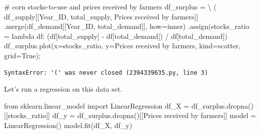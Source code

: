 \documentclass[
  letterpaper,
  DIV=11,
  numbers=noendperiod]{scrreprt}
\newenvironment{Shaded}{\begin{snugshade}}{\end{snugshade}}
\newcommand{\CommentTok}[1]{\textcolor[rgb]{0.37,0.37,0.37}{#1}}
\newcommand{\ImportTok}[1]{\textcolor[rgb]{0.00,0.46,0.62}{#1}}
\newcommand{\KeywordTok}[1]{\textcolor[rgb]{0.00,0.23,0.31}{#1}}
\newcommand{\NormalTok}[1]{\textcolor[rgb]{0.00,0.23,0.31}{#1}}
\newcommand{\OperatorTok}[1]{\textcolor[rgb]{0.37,0.37,0.37}{#1}}
\newcommand{\StringTok}[1]{\textcolor[rgb]{0.13,0.47,0.30}{#1}}
\newcommand{\VariableTok}[1]{\textcolor[rgb]{0.07,0.07,0.07}{#1}}
\begin{document}
\begin{Shaded}
\begin{Highlighting}[]
\CommentTok{\# corn stocks{-}to{-}use and prices received by farmers}
\NormalTok{df\_surplus }\OperatorTok{=} \OperatorTok{\textbackslash{}}
\NormalTok{    (}
\NormalTok{    df\_supply[[}\StringTok{\textquotesingle{}Year\_ID\textquotesingle{}}\NormalTok{, }\StringTok{\textquotesingle{}total\_supply\textquotesingle{}}\NormalTok{, }\StringTok{\textquotesingle{}Prices received by farmers\textquotesingle{}}\NormalTok{]]}
\NormalTok{        .merge(df\_demand[[}\StringTok{\textquotesingle{}Year\_ID\textquotesingle{}}\NormalTok{, }\StringTok{\textquotesingle{}total\_demand\textquotesingle{}}\NormalTok{]], how}\OperatorTok{=}\StringTok{\textquotesingle{}inner\textquotesingle{}}\NormalTok{)}
\NormalTok{        .assign(stocks\_ratio }\OperatorTok{=} \KeywordTok{lambda}\NormalTok{ df: (df[}\StringTok{\textquotesingle{}total\_supply\textquotesingle{}}\NormalTok{] }\OperatorTok{{-}}\NormalTok{ df[}\StringTok{\textquotesingle{}total\_demand\textquotesingle{}}\NormalTok{]) }\OperatorTok{/}\NormalTok{ df[}\StringTok{\textquotesingle{}total\_demand\textquotesingle{}}\NormalTok{])}
\NormalTok{df\_surplus.plot(x}\OperatorTok{=}\StringTok{\textquotesingle{}stocks\_ratio\textquotesingle{}}\NormalTok{, y}\OperatorTok{=}\StringTok{\textquotesingle{}Prices received by farmers\textquotesingle{}}\NormalTok{, kind}\OperatorTok{=}\StringTok{\textquotesingle{}scatter\textquotesingle{}}\NormalTok{, grid}\OperatorTok{=}\VariableTok{True}\NormalTok{)}\OperatorTok{;}
\end{Highlighting}
\end{Shaded}

\begin{verbatim}
SyntaxError: '(' was never closed (2394339635.py, line 3)
\end{verbatim}

Let's run a regression on this data set.

\begin{Shaded}
\begin{Highlighting}[]
\ImportTok{from}\NormalTok{ sklearn.linear\_model }\ImportTok{import}\NormalTok{ LinearRegression}
\NormalTok{df\_X }\OperatorTok{=}\NormalTok{ df\_surplus.dropna()[[}\StringTok{\textquotesingle{}stocks\_ratio\textquotesingle{}}\NormalTok{]]}
\NormalTok{df\_y }\OperatorTok{=}\NormalTok{ df\_surplus.dropna()[[}\StringTok{\textquotesingle{}Prices received by farmers\textquotesingle{}}\NormalTok{]]}
\NormalTok{model }\OperatorTok{=}\NormalTok{ LinearRegression()}
\NormalTok{model.fit(df\_X, df\_y)}
\end{Highlighting}
\end{Shaded}
\end{document}
